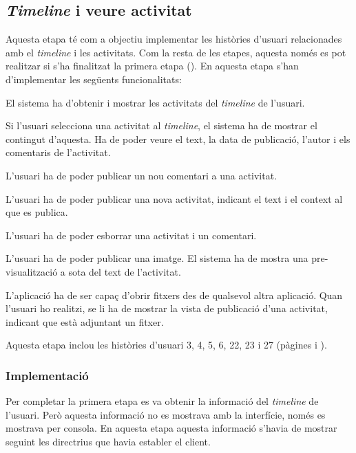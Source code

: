 \subsection{\textit{Timeline} i veure activitat}
\label{sec:etapa2}

Aquesta etapa té com a objectiu implementar les històries d'usuari relacionades amb el \textit{timeline} i les activitats. Com la resta de les etapes, aquesta només es pot realitzar si s'ha finalitzat la primera etapa (). En aquesta etapa s'han d'implementar les següents funcionalitats:


\begin{compactitem}
    \item El sistema ha d'obtenir i mostrar les activitats del \textit{timeline} de l'usuari.
    \item Si l'usuari selecciona una activitat al \textit{timeline}, el sistema ha de mostrar el contingut d'aquesta. Ha de poder veure el text, la data de publicació, l'autor i els comentaris de l'activitat.
    \item L'usuari ha de poder publicar un nou comentari a una activitat.
    \item L'usuari ha de poder publicar una nova activitat, indicant el text i el context al que es publica.
    \item L'usuari ha de poder esborrar una activitat i un comentari.
    \item L'usuari ha de poder publicar una imatge. El sistema ha de mostra una pre-visualització a sota del text de l'activitat.
    \item L'aplicació ha de ser capaç d'obrir fitxers des de qualsevol altra aplicació. Quan l'usuari ho realitzi, se li ha de mostrar la vista de publicació d'una activitat, indicant que està adjuntant un fitxer.
\end{compactitem}

Aquesta etapa inclou les històries d'usuari 3, 4, 5, 6, 22, 23 i 27 (pàgines \pageref{sec:historia_3} i \pageref{sec:historia_22}).

\subsubsection{Implementació}
Per completar la primera etapa es va obtenir la informació del \textit{timeline} de l'usuari. Però aquesta informació no es mostrava amb la interfície, només es mostrava per consola. En aquesta etapa aquesta informació s'havia de mostrar seguint les directrius que havia establer el client.

